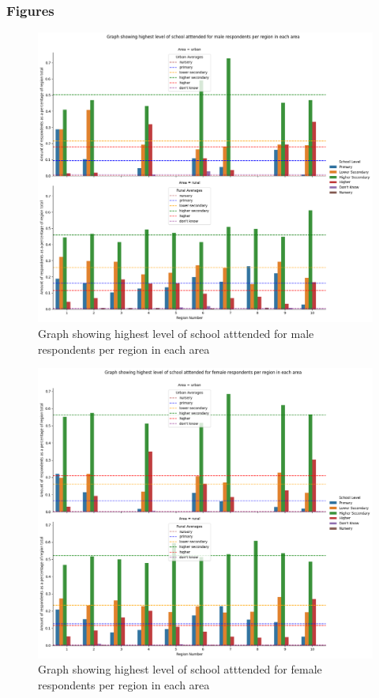 \documentclass[stu, 12pt, floatsintext,longtable]{apa7}
\begin{document}
\subsubsection{Figures}
\begin{figure}[H]
    \centering

    \includegraphics[width=\linewidth]{graphics/male_highest_school_attended.png}
    \caption{Graph showing highest level of school atttended for male
        respondents per region in each area}
    \label{fig:male_attendance}
\end{figure}
\begin{figure}[H]
    \centering

    \includegraphics[width=\linewidth]{graphics/female_highest_school_attended.png}
    \caption{Graph showing highest level of school atttended for female
        respondents per region in each area}
    \label{fig:female_attendance}
\end{figure}
\end{document}
